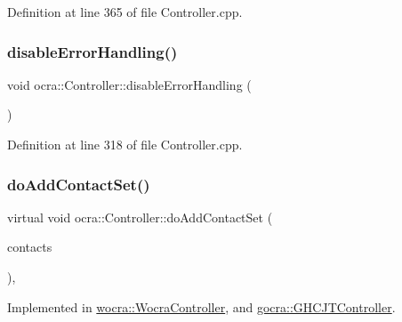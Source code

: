 Definition at line 365 of file Controller.\+cpp.

\hypertarget{classocra_1_1Controller_aad44e0db3e0039bf3d6eeb3a89a99752}{}\label{classocra_1_1Controller_aad44e0db3e0039bf3d6eeb3a89a99752} 
\subsubsection{\texorpdfstring{disable\+Error\+Handling()}{disableErrorHandling()}}
{\footnotesize\ttfamily void ocra\+::\+Controller\+::disable\+Error\+Handling (\begin{DoxyParamCaption}{ }\end{DoxyParamCaption})}



Definition at line 318 of file Controller.\+cpp.

\hypertarget{classocra_1_1Controller_acb11edc1ceaa89423c1e58f9cb38a9f7}{}\label{classocra_1_1Controller_acb11edc1ceaa89423c1e58f9cb38a9f7} 
\subsubsection{\texorpdfstring{do\+Add\+Contact\+Set()}{doAddContactSet()}}
{\footnotesize\ttfamily virtual void ocra\+::\+Controller\+::do\+Add\+Contact\+Set (\begin{DoxyParamCaption}\item[{const \hyperlink{classocra_1_1ContactSet}{Contact\+Set} \&}]{contacts }\end{DoxyParamCaption})\hspace{0.3cm}{\ttfamily [protected]}, {}}



Implemented in \hyperlink{classwocra_1_1WocraController_a74d8fa3103ca3787add351620c5bcf73}{wocra\+::\+Wocra\+Controller}, and \hyperlink{classgocra_1_1GHCJTController_a28367b3b895eaa223581131258ef5d2d}{gocra\+::\+G\+H\+C\+J\+T\+Controller}.

\hypertarget{classocra_1_1Controller_ab3477822a9363553c99eefa58ff803eb}{}\label{classocra_1_1Controller_ab3477822a9363553c99eefa58ff803eb} 
